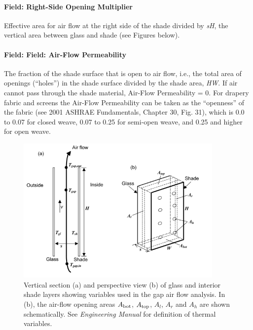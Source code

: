 \paragraph{Field: Right-Side Opening Multiplier}\label{field-right-side-opening-multiplier}

Effective area for air flow at the right side of the shade divided by \emph{sH}, the vertical area between glass and shade (see Figures below).

\paragraph{Field: Field: Air-Flow Permeability}\label{field-field-air-flow-permeability}

The fraction of the shade surface that is open to air flow, i.e., the total area of openings (``holes'') in the shade surface divided by the shade area, \emph{HW}. If air cannot pass through the shade material, Air-Flow Permeability = 0. For drapery fabric and screens the Air-Flow Permeability can be taken as the ``openness'' of the fabric (see 2001 ASHRAE Fundamentals, Chapter 30, Fig. 31), which is 0.0 to 0.07 for closed weave, 0.07 to 0.25 for semi-open weave, and 0.25 and higher for open weave.

\begin{figure}[hbtp] %
\centering
\includegraphics[width=0.9\textwidth, height=0.9\textheight, keepaspectratio=true]{media/image033.png}
\caption{Vertical section (a) and perspective view (b) of glass  and interior shade layers  showing variables used in the gap air flow analysis. In (b), the air-flow opening areas \(A_{\rm{bot}}\), \(A_{\rm{top}}\), \(A_{l}\), \(A_{r}\) and \(A_{h}\) are shown schematically. See \emph{Engineering Manual} for definition of thermal variables. \protect \label{fig:vertical-section-a-and-perspective-view-b-of}}
\end{figure}

